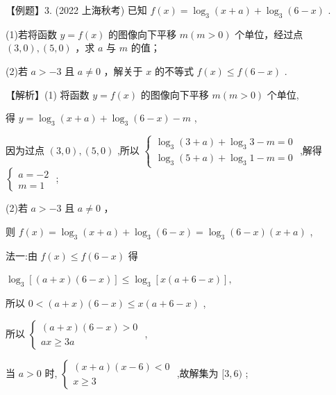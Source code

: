\documentclass[10pt]{article}
\begin{document}
【例题】3. (2022 上海秋考) 已知 \(f\left( x\right)  = {\log }_{3}\left( {x + a}\right)  + {\log }_{3}\left( {6 - x}\right)\) .

(1)若将函数 \(y = f\left( x\right)\) 的图像向下平移 \(m\left( {m > 0}\right)\) 个单位，经过点 \(\left( {3,0}\right) ,\left( {5,0}\right)\) ，求 \(a\) 与 \(m\) 的值；

(2)若 \(a >  - 3\) 且 \(a \neq  0\) ，解关于 \(x\) 的不等式 \(f\left( x\right)  \leq  f\left( {6 - x}\right)\) .

【解析】(1) 将函数 \(y = f\left( x\right)\) 的图像向下平移 \(m\left( {m > 0}\right)\) 个单位,

得 \(y = {\log }_{3}\left( {x + a}\right)  + {\log }_{3}\left( {6 - x}\right)  - m\) ,

因为过点 \(\left( {3,0}\right) ,\left( {5,0}\right)\) ,所以 \(\left\{  \begin{array}{l} {\log }_{3}\left( {3 + a}\right)  + {\log }_{3}3 - m = 0 \\  {\log }_{3}\left( {5 + a}\right)  + {\log }_{3}1 - m = 0 \end{array}\right.\) ,解得 \(\left\{  \begin{array}{l} a =  - 2 \\  m = 1 \end{array}\right.\) ;

(2)若 \(a >  - 3\) 且 \(a \neq  0\) ，

则 \(f\left( x\right)  = {\log }_{3}\left( {x + a}\right)  + {\log }_{3}\left( {6 - x}\right)  = {\log }_{3}\left( {6 - x}\right) \left( {x + a}\right)\) ,

法一:由 \(f\left( x\right)  \leq  f\left( {6 - x}\right)\) 得

\({\log }_{3}\left\lbrack  {\left( {a + x}\right) \left( {6 - x}\right) }\right\rbrack   \leq  {\log }_{3}\left\lbrack  {x\left( {a + 6 - x}\right) }\right\rbrack  ,\)

所以 \(0 < \left( {a + x}\right) \left( {6 - x}\right)  \leq  x\left( {a + 6 - x}\right)\) ,

所以 \(\left\{  \begin{array}{l} \left( {a + x}\right) \left( {6 - x}\right)  > 0 \\  {ax} \geq  {3a} \end{array}\right.\) ,

当 \(a > 0\) 时, \(\left\{  \begin{array}{l} \left( {x + a}\right) \left( {x - 6}\right)  < 0 \\  x \geq  3 \end{array}\right.\) ,故解集为 \(\lbrack 3,6)\) ;
\end{document}
